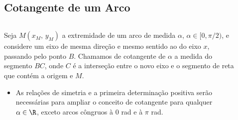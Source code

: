 \subsection{Cotangente de um Arco}
\begin{frame}
  \begin{columns}[onlytextwidth]
    \begin{column}{0.49\textwidth}\vspace{-0.5cm}
      \begin{definition}[Cotangente no 1ºQ]
        Seja $M(x_{M},\,y_{M})$ a extremidade de um arco de medida $\alpha$, $\alpha\in[0,\pi/2)$, e considere um eixo de mesma direção e mesmo sentido ao do eixo $x$, passando pelo ponto $B$. Chamamos de cotangente de $\alpha$ a medida do segmento $BC$, onde $C$ é a interseção entre o novo eixo e o segmento de reta que contém a origem e $M$.
      \end{definition}
      \begin{highlight}
        \begin{itemize}
          \item As relações de simetria e a primeira determinação positiva serão necessárias para ampliar o conceito de cotangente para qualquer $\alpha\in\R$, exceto arcos côngruos à $0$ rad e à $\pi$ rad.
        \end{itemize}
      \end{highlight}
    \end{column}
    \begin{column}{0.49\textwidth}\vspace{-0.5cm}
      \begin{figure}
      \end{figure}
    \end{column}
  \end{columns}
\end{frame}

